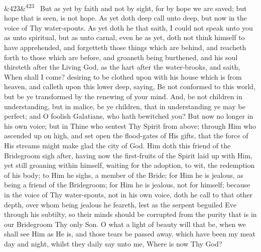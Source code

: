 \documentclass[12pt]{article}
\newcommand{\para}[1][]{\par\noindent\ifx&#1&\else\textsuperscript{\footnotesize #1}~\fi}
\begin{document}
\para[423] But as yet by faith and not by sight, for by hope we are saved; but hope that is seen, is not hope. As yet doth deep call unto deep, but now in the voice of Thy water-spouts. As yet doth he that saith, I could not speak unto you as unto spiritual, but as unto carnal, even he as yet, doth not think himself to have apprehended, and forgetteth those things which are behind, and reacheth forth to those which are before, and groaneth being burthened, and his soul thirsteth after the Living God, as the hart after the water-brooks, and saith, When shall I come? desiring to be clothed upon with his house which is from heaven, and calleth upon this lower deep, saying, Be not conformed to this world, but be ye transformed by the renewing of your mind. And, be not children in understanding, but in malice, be ye children, that in understanding ye may be perfect; and O foolish Galatians, who hath bewitched you? But now no longer in his own voice; but in Thine who sentest Thy Spirit from above; through Him who ascended up on high, and set open the flood-gates of His gifts, that the force of His streams might make glad the city of God. Him doth this friend of the Bridegroom sigh after, having now the first-fruits of the Spirit laid up with Him, yet still groaning within himself, waiting for the adoption, to wit, the redemption of his body; to Him he sighs, a member of the Bride; for Him he is jealous, as being a friend of the Bridegroom; for Him he is jealous, not for himself; because in the voice of Thy water-spouts, not in his own voice, doth he call to that other depth, over whom being jealous he feareth, lest as the serpent beguiled Eve through his subtilty, so their minds should be corrupted from the purity that is in our Bridegroom Thy only Son. O what a light of beauty will that be, when we shall see Him as He is, and those tears be passed away, which have been my meat day and night, whilst they daily say unto me, Where is now Thy God?
\end{document}
